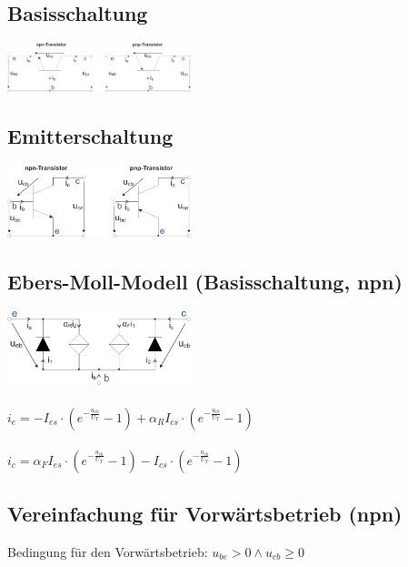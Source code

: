 \documentclass[a4paper,twocolumn,10pt]{article}
\begin{document}
\subsection*{Basisschaltung}
\includegraphics[width=0.4\textwidth]{Grafiken/Transistor_Basisschaltung}
\subsection*{Emitterschaltung}
\includegraphics[width=0.4\textwidth]{Grafiken/Transistor_Emitterschaltung}

\subsection*{Ebers-Moll-Modell (Basisschaltung, npn)}
\includegraphics[width=0.4\textwidth]{Grafiken/Ebers-Moll}\\\\
$i_e=-I_{es}\cdot (e^{-\frac{u_{eb}}{U_T}}-1)+\alpha_RI_{cs}\cdot (e^{-\frac{u_{cb}}{U_T}}-1)$\\\\
$i_c=\alpha_FI_{es}\cdot (e^{-\frac{u_{eb}}{U_T}}-1)-I_{cs}\cdot (e^{-\frac{u_{cb}}{U_T}}-1)$

\subsection*{Vereinfachung für Vorwärtsbetrieb (npn)}
Bedingung für den Vorwärtsbetrieb: $u_{be}>0 \wedge u_{cb}\geq 0$
\end{document}
